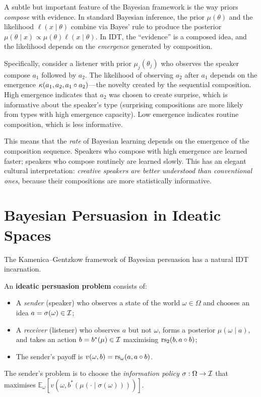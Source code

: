\begin{remark}
A subtle but important feature of the Bayesian framework is the way
priors \emph{compose} with evidence.  In standard Bayesian inference,
the prior $\mu(\theta)$ and the likelihood $\ell(x \mid \theta)$ combine
via Bayes' rule to produce the posterior $\mu(\theta \mid x) \propto
\mu(\theta) \ell(x \mid \theta)$.  In IDT, the ``evidence'' is a composed
idea, and the likelihood depends on the \emph{emergence} generated by
composition.

Specifically, consider a listener with prior $\mu_j(\theta_j)$ who
observes the speaker compose $a_1$ followed by $a_2$.  The likelihood
of observing $a_2$ after $a_1$ depends on the emergence
$\kappa(a_1, a_2, a_1 \circ a_2)$---the novelty created by the
sequential composition.  High emergence indicates that $a_2$ was
chosen to create surprise, which is informative about the speaker's
type (surprising compositions are more likely from types with high
emergence capacity).  Low emergence indicates routine composition,
which is less informative.

This means that the \emph{rate} of Bayesian learning depends on the
emergence of the composition sequence.  Speakers who compose with
high emergence are learned faster; speakers who compose routinely
are learned slowly.  This has an elegant cultural interpretation:
\emph{creative speakers are better understood than conventional ones},
because their compositions are more statistically informative.
\end{remark}

\section{Bayesian Persuasion in Ideatic Spaces}
\label{sec:persuasion}

The Kamenica--Gentzkow framework of Bayesian persuasion has a
natural IDT incarnation.

\begin{definition}
\label{def:persuasion}
An \textbf{ideatic persuasion problem} consists of:
\begin{itemize}
  \item A \emph{sender} (speaker) who observes a state of the world
        $\omega \in \Omega$ and chooses an idea $a = \sigma(\omega) \in \mathcal{I}$;
  \item A \emph{receiver} (listener) who observes $a$ but not $\omega$,
        forms a posterior $\mu(\omega \mid a)$, and takes an action
        $b = b^*(\mu) \in \mathcal{I}$ maximising $\mathrm{rs}_2(b, a \circ b)$;
  \item The sender's payoff is $v(\omega, b) = \mathrm{rs}_{\omega}(a, a \circ b)$.
\end{itemize}
The sender's problem is to choose the \emph{information policy}
$\sigma : \Omega \to \mathcal{I}$ that maximises $\mathbb{E}_\omega[v(\omega,
b^*(\mu(\cdot \mid \sigma(\omega))))]$.
\end{definition}

